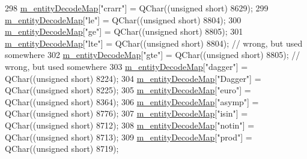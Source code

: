 \begin{DoxyCode}
298         \hyperlink{classLCHMFileImpl_ae00b1b33fde26e719bc22207c11e589f}{m\_entityDecodeMap}[\textcolor{stringliteral}{"crarr"}]  = QChar((\textcolor{keywordtype}{unsigned} \textcolor{keywordtype}{short}) 8629);
299         \hyperlink{classLCHMFileImpl_ae00b1b33fde26e719bc22207c11e589f}{m\_entityDecodeMap}[\textcolor{stringliteral}{"le"}]  = QChar((\textcolor{keywordtype}{unsigned} \textcolor{keywordtype}{short}) 8804);
300         \hyperlink{classLCHMFileImpl_ae00b1b33fde26e719bc22207c11e589f}{m\_entityDecodeMap}[\textcolor{stringliteral}{"ge"}]  = QChar((\textcolor{keywordtype}{unsigned} \textcolor{keywordtype}{short}) 8805);
301         \hyperlink{classLCHMFileImpl_ae00b1b33fde26e719bc22207c11e589f}{m\_entityDecodeMap}[\textcolor{stringliteral}{"lte"}]  = QChar((\textcolor{keywordtype}{unsigned} \textcolor{keywordtype}{short}) 8804); \textcolor{comment}{// wrong, but used
       somewhere}
302         \hyperlink{classLCHMFileImpl_ae00b1b33fde26e719bc22207c11e589f}{m\_entityDecodeMap}[\textcolor{stringliteral}{"gte"}]  = QChar((\textcolor{keywordtype}{unsigned} \textcolor{keywordtype}{short}) 8805); \textcolor{comment}{// wrong, but used
       somewhere}
303         \hyperlink{classLCHMFileImpl_ae00b1b33fde26e719bc22207c11e589f}{m\_entityDecodeMap}[\textcolor{stringliteral}{"dagger"}]  = QChar((\textcolor{keywordtype}{unsigned} \textcolor{keywordtype}{short}) 8224);
304         \hyperlink{classLCHMFileImpl_ae00b1b33fde26e719bc22207c11e589f}{m\_entityDecodeMap}[\textcolor{stringliteral}{"Dagger"}]  = QChar((\textcolor{keywordtype}{unsigned} \textcolor{keywordtype}{short}) 8225);
305         \hyperlink{classLCHMFileImpl_ae00b1b33fde26e719bc22207c11e589f}{m\_entityDecodeMap}[\textcolor{stringliteral}{"euro"}]  = QChar((\textcolor{keywordtype}{unsigned} \textcolor{keywordtype}{short}) 8364);
306         \hyperlink{classLCHMFileImpl_ae00b1b33fde26e719bc22207c11e589f}{m\_entityDecodeMap}[\textcolor{stringliteral}{"asymp"}]  = QChar((\textcolor{keywordtype}{unsigned} \textcolor{keywordtype}{short}) 8776);
307         \hyperlink{classLCHMFileImpl_ae00b1b33fde26e719bc22207c11e589f}{m\_entityDecodeMap}[\textcolor{stringliteral}{"isin"}]  = QChar((\textcolor{keywordtype}{unsigned} \textcolor{keywordtype}{short}) 8712);
308         \hyperlink{classLCHMFileImpl_ae00b1b33fde26e719bc22207c11e589f}{m\_entityDecodeMap}[\textcolor{stringliteral}{"notin"}]  = QChar((\textcolor{keywordtype}{unsigned} \textcolor{keywordtype}{short}) 8713);
309         \hyperlink{classLCHMFileImpl_ae00b1b33fde26e719bc22207c11e589f}{m\_entityDecodeMap}[\textcolor{stringliteral}{"prod"}]  = QChar((\textcolor{keywordtype}{unsigned} \textcolor{keywordtype}{short}) 8719);

\end{DoxyCode}
